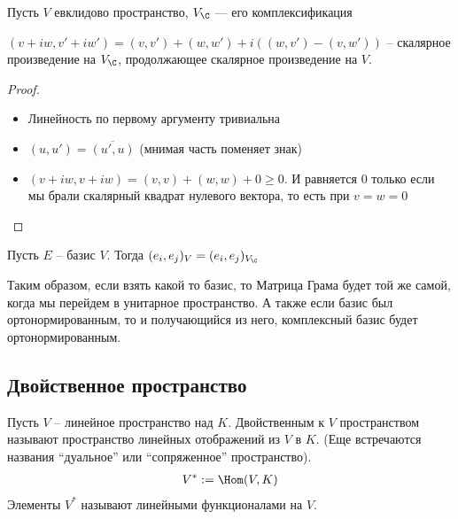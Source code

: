 \begin{theorem-non}
Пусть $V$ евклидово пространство, $V_{\C}$ --- его комплексификация

$(v + iw, v' + iw') = (v, v') + (w, w') + i((w, v') - (v, w'))$ -- скалярное произведение на $V_{\C}$, продолжающее 
скалярное произведение на $V$.
\end{theorem-non}
\begin{proof} \quad

    \begin{itemize}
        \item Линейность по первому аргументу тривиальна
        \item $(u, u') = \overline{(u', u)}$ (мнимая часть поменяет знак)
        \item $(v + iw, v + iw) = (v, v) + (w, w) + 0 \geqslant 0$. И равняется $0$ только если мы брали скалярный квадрат нулевого вектора, то есть при $v = w = 0$
    \end{itemize}
\end{proof}
\notice Пусть $E$ -- базис $V$. Тогда 
$(e_i, e_j)_V = (e_i, e_j)_{V_{\C}}$

Таким образом, если взять какой то базис, то Матрица Грама будет той же самой, когда мы перейдем в унитарное пространство. А также
если базис был ортонормированным, то и получающийся из него, комплексный базис будет ортонормированным. 

\subsection{Двойственное пространство}
\begin{conj}
    Пусть $V$ -- линейное пространство над $K$.
    Двойственным к $V$ пространством называют пространство линейных отображений из $V$ в $K$.
    (Еще встречаются названия ``дуальное'' или ``сопряженное'' пространство).
    \begin{gather*}
        V^* := \Hom(V, K)
    \end{gather*}
    Элементы $V^*$ называют линейными функционалами на $V$.
\end{conj}

